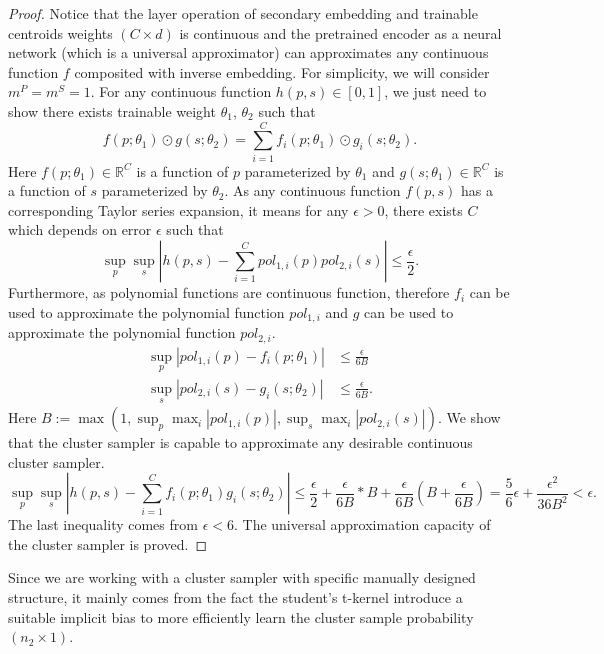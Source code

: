 \begin{proof}
    Notice that the layer operation of secondary embedding and trainable centroids weights $(C \times d)$ is continuous and the pretrained encoder as a neural network (which is a universal approximator) can approximates any continuous function $f$ composited with inverse embedding. 
    For simplicity, we will consider $m^P = m^S = 1$. 
    For any continuous function $h(p, s) \in [0, 1]$,
    we just need to show there exists trainable weight $\theta_1$, $\theta_2$ such that 
    \begin{equation}
        f(p; \theta_1) \odot g(s; \theta_2) = \sum_{i=1}^C f_i(p; \theta_1) \odot g_i(s; \theta_2). 
    \end{equation}
    Here $f(p; \theta_1) \in \mathbb{R}^C$ is a function of $p$ parameterized by $\theta_1$ and $g(s; \theta_1) \in \mathbb{R}^C$ is a function of $s$ parameterized by $\theta_2$.  
    As any continuous function $f(p, s)$ has a corresponding Taylor series expansion, it means for any $\epsilon > 0$, there exists $C$ which depends on error $\epsilon$ such that
    \begin{equation}
        \sup_p \sup_s |h(p, s) -\sum_{i=1}^C pol_{1,i}(p) pol_{2,i}(s)| \leq \frac{\epsilon}{2}. 
    \end{equation}
    Furthermore, as polynomial functions are continuous function, therefore $f_i$ can be used to approximate the polynomial function $pol_{1, i}$ and $g$ can be used to approximate the polynomial function $pol_{2, i}$.
    \begin{align}
        \sup_p |pol_{1,i}(p) - f_i(p; \theta_1)| & \leq \frac{\epsilon}{6B} \\ 
        \sup_s |pol_{2,i}(s) - g_i(s; \theta_2)| & \leq \frac{\epsilon}{6B}. 
    \end{align}
    Here $B := \max(1, \sup_p \max_{i} |pol_{1, i}(p)|, \sup_s \max_{i} |pol_{2, i}(s)|).$ 
    We show that the cluster sampler is capable to approximate any desirable continuous cluster sampler. 
    \begin{equation}
        \sup_p \sup_s |h(p, s) -\sum_{i=1}^C f_i(p; \theta_1) g_i(s; \theta_2)| \leq \frac{\epsilon}{2} + \frac{\epsilon}{6B} * B + \frac{\epsilon}{6B} (B + \frac{\epsilon}{6B}) = \frac{5}{6} \epsilon + \frac{\epsilon^2}{36B^2} < \epsilon. 
    \end{equation}
    The last inequality comes from $\epsilon < 6$. 
    The universal approximation capacity of the cluster sampler is proved. 
\end{proof}

\begin{remark}
    Since we are working with a cluster sampler with specific manually designed structure, it mainly comes from the fact the student's t-kernel introduce a suitable implicit bias to more efficiently learn the cluster sample probability $(n_2 \times 1)$. 
\end{remark}
